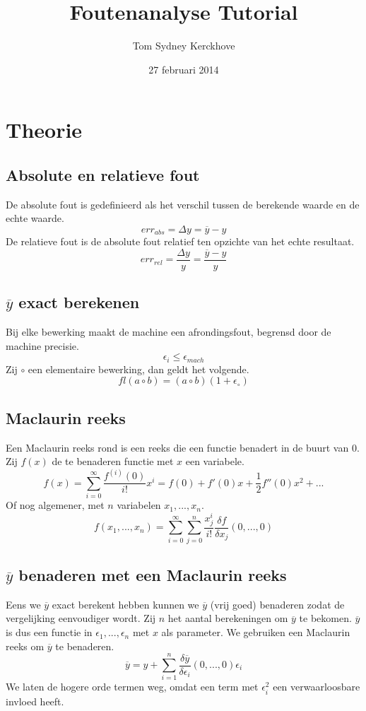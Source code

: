 \documentclass[10pt,a4paper]{article}
\author{Tom Sydney Kerckhove}
\title{Foutenanalyse Tutorial}
\date{27 februari 2014}
\begin{document}
\maketitle
\tableofcontents
\pagebreak

\section{Theorie}
\subsection{Absolute en relatieve fout}
De absolute fout is gedefinieerd als het verschil tussen de berekende waarde en de echte waarde.
\[
err_{abs} = \Delta y = \overline{y} - y
\]
De relatieve fout is de absolute fout relatief ten opzichte van het echte resultaat.
\[
err_{rel} = \frac{\Delta y}{y} = \frac{\overline{y} - y}{y}
\]

\subsection{$\overline{y}$ exact berekenen}
Bij elke bewerking maakt de machine een afrondingsfout, begrensd door de machine precisie.
\[
\epsilon_i \le \epsilon_{mach}
\]
Zij $\circ$ een elementaire bewerking, dan geldt het volgende.
\[
fl(a\circ b) = (a\circ b)(1+\epsilon_{\circ})
\]

\subsection{Maclaurin reeks}
Een Maclaurin reeks rond is een reeks die een functie benadert in de buurt van $0$. Zij $f(x)$ de te benaderen functie met $x$ een variabele.
\[
f(x) = \sum_{i=0}^\infty\frac{f^{(i)}(0)}{i!}x^i = f(0) + f'(0)x + \frac{1}{2}f''(0)x^2 + ...
\]
Of nog algemener, met $n$ variabelen $x_1,...,x_n$.
\[
f(x_1,...,x_n) = \sum_{i=0}^\infty\sum_{j=0}^{n}\frac{x_j^i}{i!}\frac{\delta f}{\delta x_j}(0,...,0)
\]

\subsection{$\overline{y}$ benaderen met een Maclaurin reeks}
Eens we $\overline{y}$ exact berekent hebben kunnen we $\overline{y}$ (vrij goed) benaderen zodat de vergelijking eenvoudiger wordt. Zij $n$ het aantal berekeningen om $\overline{y}$ te bekomen. $\overline{y}$ is dus een functie in $\epsilon_1,...,\epsilon_n$ met $x$ als parameter. We gebruiken een Maclaurin reeks om $\overline{y}$ te benaderen.
\[
\overline{y} = y + \sum_{i=1}^{n}\frac{\delta\overline{y}}{\delta\epsilon_i}(0,...,0)\epsilon_i
\]
We laten de hogere orde termen weg, omdat een term met $\epsilon_{i}^2$ een verwaarloosbare invloed heeft. 
\end{document}
